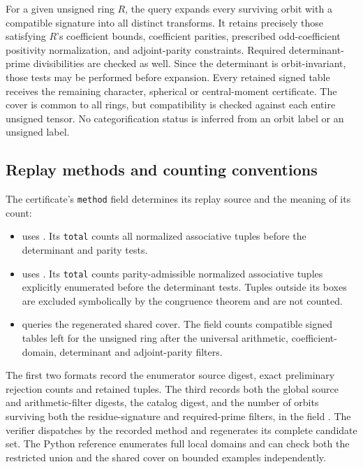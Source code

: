 \documentclass[11pt]{article}
\begin{document}
For a given unsigned ring $R$, the query expands every surviving
orbit with a compatible signature into all distinct transforms. It retains precisely those
satisfying $R$'s coefficient bounds, coefficient parities, prescribed
odd-coefficient positivity normalization, and adjoint-parity
constraints. Required determinant-prime divisibilities are checked
as well. Since the determinant is orbit-invariant, those tests may
be performed before expansion. Every retained signed table receives
the remaining character, spherical or central-moment certificate.
The cover is common to all rings, but compatibility is checked against
each entire unsigned tensor. No categorification status is inferred
from an orbit label or an unsigned label.

\subsection{Replay methods and counting conventions}
The certificate's \texttt{method} field determines its replay source
and the meaning of its count:
\begin{itemize}
\item {} uses
. Its \texttt{total} counts all
normalized associative tuples before the determinant and parity tests.
\item {} uses
. Its \texttt{total}
counts parity-admissible normalized associative tuples explicitly
enumerated before the determinant tests. Tuples outside its boxes
are excluded symbolically by the congruence theorem and are not counted.
\item {} queries the regenerated shared
cover. The field  counts compatible signed
tables left for the unsigned ring after the universal arithmetic,
coefficient-domain, determinant and adjoint-parity filters.
\end{itemize}
The first two formats record the enumerator source digest, exact
preliminary rejection counts and retained tuples. The third records
both the global source and arithmetic-filter digests, the catalog
digest, and the number of orbits surviving both the residue-signature
and required-prime filters, in the field . The verifier dispatches by the recorded method and regenerates
its complete candidate set. The Python reference enumerates full
local domains and can check both the restricted union and the shared
cover on bounded examples independently.
\end{document}
